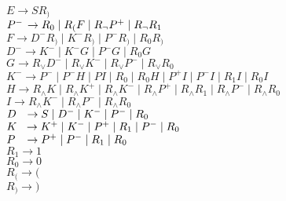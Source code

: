 \documentclass[11pt]{article}
\begin{document}
\begin{enumerate}
\begin{itemize}
\\\hspace*{6mm} $E \rightarrow SR_{)}$
\\\hspace*{6mm} $P^{-} \hspace{0,5mm}\rightarrow R_{0}\mid R_{(}F\mid R_{\neg}P^{+} \mid R_{\neg}R_{1}$
\\\hspace*{6mm} $F \rightarrow D^{-}R_{)} \mid K^{-}R_{)} \mid P^{-}R_{)} \mid R_{0}R_{)}$
\\\hspace*{6mm} $D^{-} \rightarrow K^{-}\mid K^{-}G \mid P^{-}G \mid R_{0}G$
\\\hspace*{6mm} $G \rightarrow R_{\vee}D^{-} \mid R_{\vee}K^{-} \mid R_{\vee}P^{-} \mid R_{\vee}R_{0}$
\\\hspace*{6mm} $K^{-} \rightarrow P^{-}\mid P^{-} H\mid PI \mid R_{0} \mid R_{0}H \mid P^{+}I \mid P^{-}I \mid R_{1}I \mid R_{0}I$
\\\hspace*{6mm} $H \rightarrow R_{\wedge} K \mid R_{\wedge} K^{+} \mid R_{\wedge} K^{-} \mid R_{\wedge} P^{+} \mid R_{\wedge} R_{1} \mid R_{\wedge} P^{-} \mid R_{\wedge} R_{0}$
\\\hspace*{6mm} $I \rightarrow R_{\wedge} K^{-} \mid R_{\wedge} P^{-} \mid R_{\wedge}R_{0}$
\\\hspace*{6mm} $D \hspace{2,5mm}\rightarrow S\mid D^{-} \mid K^{-} \mid P^{-} \mid R_{0}$
\\\hspace*{6mm} $K \hspace{2,2mm}\rightarrow K^{+}\mid K^{-} \mid P^{+} \mid R_{1} \mid P^{-} \mid R_{0}$
\\\hspace*{6mm} $P \hspace{2,8mm}\rightarrow P^{+}\mid P^{-} \mid R_{1} \mid R_{0}$
\\\hspace*{6mm} $R_{1} \rightarrow 1$
\\\hspace*{6mm} $R_{0} \rightarrow 0$
\\\hspace*{6mm} $R_{(} \rightarrow ($
\\\hspace*{6mm} $R_{)} \rightarrow )$

\end{itemize}
\end{enumerate}
\end{document}
